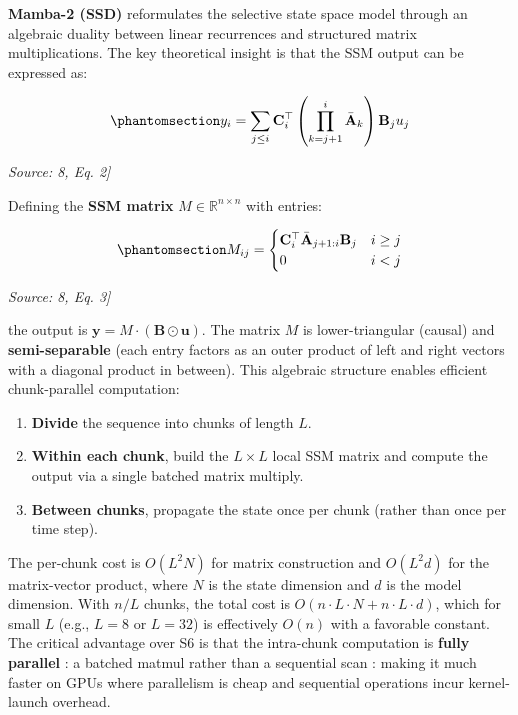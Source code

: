 \textbf{Mamba-2 (SSD)} \cite{DaoGu2024TransformersSSM} reformulates the selective state space model through an algebraic duality between linear recurrences and structured matrix multiplications. The key theoretical insight is that the SSM output can be expressed as:

\begin{equation}\protect\phantomsection\label{eq:mamba-ssd-output}{y_i = \sum_{j \leq i} \mathbf{C}_i^\top \left(\prod_{k=j+1}^{i} \bar{\mathbf{A}}_k\right) \mathbf{B}_j u_j
}\end{equation} \par{\small\textit{Source: \cite{Laneman2004CooperativeDiversity}8, Eq. 2]}}

Defining the \textbf{SSM matrix} \(M \in \mathbb{R}^{n \times n}\) with entries:

\begin{equation}\protect\phantomsection\label{eq:mamba-ssd-matrix}{M_{ij} = \begin{cases} \mathbf{C}_i^\top \bar{\mathbf{A}}_{j+1:i} \mathbf{B}_j & i \geq j \\ 0 & i < j \end{cases}
}\end{equation} \par{\small\textit{Source: \cite{Laneman2004CooperativeDiversity}8, Eq. 3]}}

the output is \(\mathbf{y} = M \cdot (\mathbf{B} \odot \mathbf{u})\). The matrix \(M\) is lower-triangular (causal) and \textbf{semi-separable} (each entry factors as an outer product of left and right vectors with a diagonal product in between). This algebraic structure enables efficient chunk-parallel computation:

\begin{enumerate}
\def\labelenumi{\arabic{enumi}.}
\tightlist
\item
  \textbf{Divide} the sequence into chunks of length \(L\).
\item
  \textbf{Within each chunk}, build the \(L \times L\) local SSM matrix and compute the output via a single batched matrix multiply.
\item
  \textbf{Between chunks}, propagate the state once per chunk (rather than once per time step).
\end{enumerate}

The per-chunk cost is \(O(L^2 N)\) for matrix construction and \(O(L^2 d)\) for the matrix-vector product, where \(N\) is the state dimension and \(d\) is the model dimension. With \(n/L\) chunks, the total cost is \(O(n \cdot L \cdot N + n \cdot L \cdot d)\), which for small \(L\) (e.g., \(L = 8\) or \(L = 32\)) is effectively \(O(n)\) with a favorable constant. The critical advantage over S6 is that the intra-chunk computation is \textbf{fully parallel} : a batched matmul rather than a sequential scan : making it much faster on GPUs where parallelism is cheap and sequential operations incur kernel-launch overhead.

